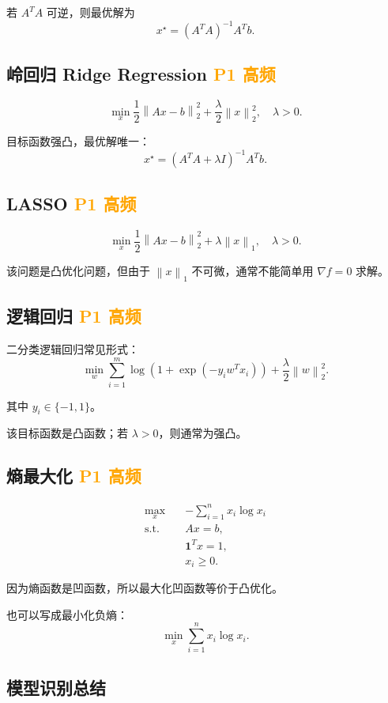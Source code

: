 \documentclass[11pt,a4paper]{ctexart}
\newcommand{\st}{\text{s.t.}}
\newcommand{\norm}[1]{\left\lVert #1 \right\rVert}
\newcommand{\Pone}{\textcolor{orange}{\textbf{P1 高频}}}
\theoremstyle{definition}
\theoremstyle{plain}
\theoremstyle{remark}
\begin{document}
若 $A^TA$ 可逆，则最优解为
\[
    x^\star=(A^TA)^{-1}A^Tb.
\]

\subsection{岭回归 Ridge Regression \Pone}

\[
    \min_x
    \frac12\norm{Ax-b}_2^2
    +
    \frac{\lambda}{2}\norm{x}_2^2,
    \quad \lambda>0.
\]

目标函数强凸，最优解唯一：
\[
    x^\star=(A^TA+\lambda I)^{-1}A^Tb.
\]

\subsection{LASSO \Pone}

\[
    \min_x
    \frac12\norm{Ax-b}_2^2+\lambda\norm{x}_1,
    \quad \lambda>0.
\]

该问题是凸优化问题，但由于 $\norm{x}_1$ 不可微，通常不能简单用 $\nabla f=0$ 求解。

\subsection{逻辑回归 \Pone}

二分类逻辑回归常见形式：
\[
    \min_w
    \sum_{i=1}^m
    \log\left(1+\exp(-y_iw^Tx_i)\right)
    +
    \frac{\lambda}{2}\norm{w}_2^2.
\]

其中 $y_i\in\{-1,1\}$。

该目标函数是凸函数；若 $\lambda>0$，则通常为强凸。

\subsection{熵最大化 \Pone}

\[
\begin{aligned}
    \max_x\quad & -\sum_{i=1}^n x_i\log x_i\\
    \st\quad & Ax=b,\\
    & \mathbf{1}^Tx=1,\\
    & x_i\ge0.
\end{aligned}
\]

因为熵函数是凹函数，所以最大化凹函数等价于凸优化。

也可以写成最小化负熵：
\[
    \min_x \sum_{i=1}^n x_i\log x_i.
\]

\subsection{模型识别总结}
\end{document}
